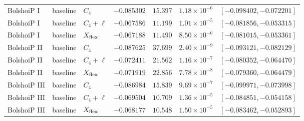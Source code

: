 \begin{tabular}{lllrrrl}
BolshoiP I & baseline & $C_4$ & $-0.085302$ & $15.397$ & $1.18\times10^{-6}$ & $[-0.098402, -0.072201]$ \\
BolshoiP I & baseline & $C_4+\ell$ & $-0.067586$ & $11.199$ & $1.01\times10^{-5}$ & $[-0.081856, -0.053315]$ \\
BolshoiP I & baseline & $X_{\rm flex}$ & $-0.067188$ & $11.490$ & $8.50\times10^{-6}$ & $[-0.081015, -0.053361]$ \\
BolshoiP II & baseline & $C_4$ & $-0.087625$ & $37.699$ & $2.40\times10^{-9}$ & $[-0.093121, -0.082129]$ \\
BolshoiP II & baseline & $C_4+\ell$ & $-0.072411$ & $21.562$ & $1.16\times10^{-7}$ & $[-0.080352, -0.064470]$ \\
BolshoiP II & baseline & $X_{\rm flex}$ & $-0.071919$ & $22.856$ & $7.78\times10^{-8}$ & $[-0.079360, -0.064479]$ \\
BolshoiP III & baseline & $C_4$ & $-0.086984$ & $15.839$ & $9.69\times10^{-7}$ & $[-0.099971, -0.073998]$ \\
BolshoiP III & baseline & $C_4+\ell$ & $-0.069504$ & $10.709$ & $1.36\times10^{-5}$ & $[-0.084851, -0.054158]$ \\
BolshoiP III & baseline & $X_{\rm flex}$ & $-0.068177$ & $10.548$ & $1.50\times10^{-5}$ & $[-0.083462, -0.052893]$ \\
\bottomrule
\end{tabular}
